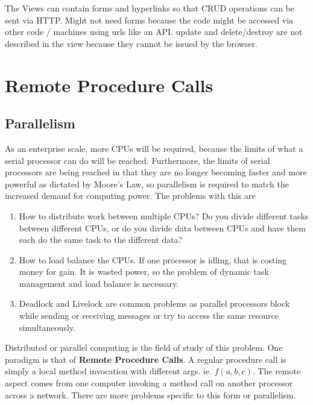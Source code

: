 \documentclass[11pt]{article}
\begin{document}
The Views can contain forms and hyperlinks so that CRUD operations can be sent via HTTP. Might not need forms because the code might be accessed via other code / machines using urls like an API. update and delete/destroy are not described in the view because they cannot be issued by the browser.




\section{Remote Procedure Calls}
\label{sec:RPC}

\subsection{Parallelism}
As an enterprise scale, more CPUs will be required, because the limits of what a serial processor can do will be reached. Furthermore, the limits of serial processors are being reached in that they are no longer becoming faster and more powerful as dictated by Moore's Law, so parallelism is required to match the increased demand for computing power. The problems with this are
\begin{enumerate}
   \item How to distribute work between multiple CPUs? Do you divide different tasks between different CPUs, or do you divide data between CPUs and have them each do the same task to the different data?
   \item How to load balance the CPUs. If one processor is idling, that is costing money for gain. It is wasted power, so the problem of dynamic task management and load balance is necessary.
   \item Deadlock and Livelock are common problems as parallel processors block while sending or receiving messages or try to access the same resource simultaneously.
 \end{enumerate}

Distributed or parallel computing is the field of study of this problem. One paradigm is that of \textbf{Remote Procedure Calls}. A regular procedure call is simply a local method invocation with different args. ie. $f(a, b, c)$. The remote aspect comes from one computer invoking a method call on another processor across a network. There are more problems specific to this form or parallelism.
\end{document}
